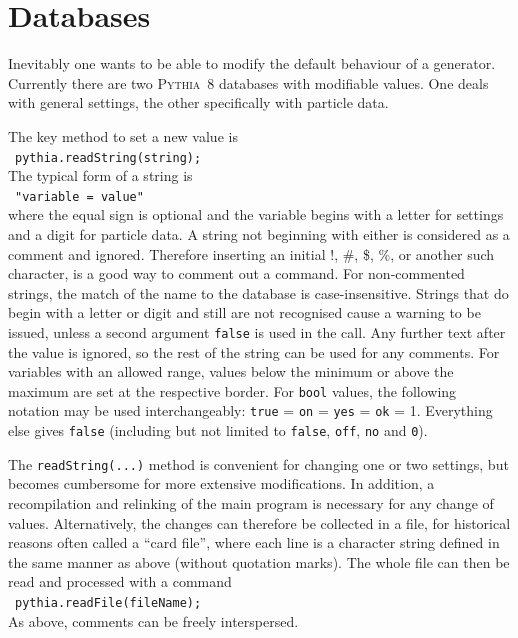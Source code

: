 \documentclass{elsartmod}
\newcommand{\cindent}{\hspace*{10mm}~}
\begin{document}
\section{Databases \label{sec:databases}}

Inevitably one wants to be able to modify the default behaviour of a 
generator. Currently there are two \textsc{Pythia}~8 databases with 
modifiable values. One deals with general settings, the other 
specifically with particle data. 

The key method to set a new value is\\
\cindent \texttt{pythia.readString(string);}\\
The typical form of a string is\\ 
\cindent \texttt{"variable = value"}\\
where the equal sign is optional and the variable begins with a letter 
for settings and a digit for particle data. A string not beginning with 
either is considered as a comment and ignored. Therefore inserting an 
initial !, \#, \$, \%, or another such character, is a good way to 
comment out a command. For non-commented strings, the match of the name 
to the database is case-insensitive. Strings that do begin with a letter 
or digit and still are not recognised cause a warning to be issued, unless 
a second argument \texttt{false} is used in the call. Any further text 
after the value is ignored, so the rest of the string can be used for 
any comments. For variables with an allowed range, values below the minimum 
or above the maximum are set at the respective border. For \texttt{bool} 
values, the following notation may be used interchangeably: 
\texttt{true} = \texttt{on} = \texttt{yes} = \texttt{ok} = 1. Everything 
else gives \texttt{false} (including but not limited to \texttt{false}, 
\texttt{off}, \texttt{no} and \texttt{0}). 

The \texttt{readString(...)} method is convenient for changing one or two 
settings, but becomes cumbersome for more extensive modifications. In 
addition, a recompilation and relinking of the main program is 
necessary for any change of values. Alternatively, the changes can 
therefore be collected in a file, for historical reasons 
often called a ``card file'', where each line is a 
character string defined in the same manner as above (without
quotation marks). 
The whole file can then be read and processed with a command\\
\cindent \texttt{pythia.readFile(fileName);}\\
As above, comments can be freely interspersed. 
\end{document}
